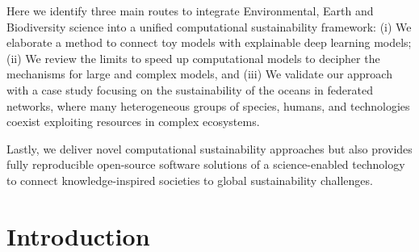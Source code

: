 \documentclass[12pt,a4paper]{article}
\begin{document}
Here we identify three main routes to integrate Environmental, Earth and Biodiversity science into a unified computational sustainability framework: (i) We elaborate a method to connect toy models with explainable deep learning models; (ii) We review the limits to speed up computational models to decipher the mechanisms for large and complex models, and (iii) We validate our approach with a case study focusing on the sustainability of the oceans in federated networks, where many heterogeneous groups of species, humans, and technologies coexist exploiting resources in complex ecosystems.

Lastly, we deliver novel computational sustainability approaches but also provides fully reproducible open-source software solutions of a science-enabled technology to connect knowledge-inspired societies to global sustainability challenges.

\newpage

\section{Introduction}
\end{document}
